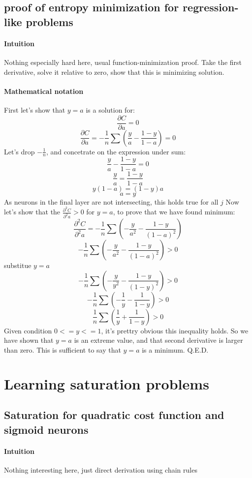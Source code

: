 \documentclass{article}
\begin{document}
\subsection{proof of entropy minimization for regression-like problems}
\paragraph{Intuition}
Nothing especially hard here, usual function-minimization proof. 
Take the first derivative, solve it relative to zero, show that this is minimizing solution.
\paragraph{Mathematical notation}
First let's show that $y = a$ is a solution for:
 $$\frac{\partial C}{\partial a} = 0$$
 $$\frac{\partial C}{\partial a} = -\frac{1}{n}\sum(\frac{y}{a} - \frac{1-y}{1-a}) = 0$$
Let's drop $-\frac{1}{n}$, and concetrate on the expression under sum:
 $$\frac{y}{a} - \frac{1-y}{1-a} = 0$$
 $$\frac{y}{a} = \frac{1-y}{1-a}$$
 $$y(1-a) = (1-y)a$$
$$a = y$$
As neurons in the final layer are not intersecting, this holds true for all $j$
Now let's show that the $\frac{\partial^2 C}{\partial^2 a} > 0$ for $y = a$, to prove that we have found minimum:
$$\frac{\partial^2 C}{\partial^2 a} = -\frac{1}{n}\sum(-\frac{y}{a^2} - \frac{1-y}{(1-a)^2})$$
$$-\frac{1}{n}\sum(-\frac{y}{a^2} - \frac{1-y}{(1-a)^2}) > 0$$
substitue $y = a$
$$-\frac{1}{n}\sum(-\frac{y}{y^2} - \frac{1-y}{(1-y)^2}) > 0$$
$$-\frac{1}{n}\sum(-\frac{1}{y} - \frac{1}{1-y}) > 0$$
$$\frac{1}{n}\sum(\frac{1}{y} + \frac{1}{1-y}) > 0$$
Given condition $ 0 <= y <= 1$, it's prettry obvious this inequality holds.
So we have shown that $y = a$ is an extreme value, and that second derivative is larger than zero.
This is sufficient to say that $y = a$ is a minimum. 
Q.E.D.

\section{Learning saturation problems}
\subsection{Saturation for quadratic cost function and sigmoid neurons}
\paragraph{Intuition}
Nothing interesting here, just direct derivation using chain rules
\end{document}
